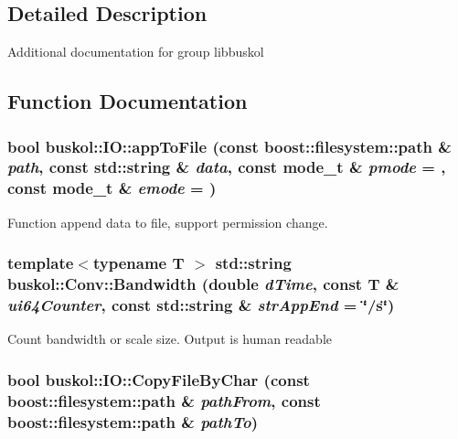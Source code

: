 \subsection{Detailed Description}
Additional documentation for group libbuskol 

\subsection{Function Documentation}
\hypertarget{group__libbuskol_gaada29d4b7a4c47579e1b25ea63c47e15}{
\subsubsection[{appToFile}]{\setlength{\rightskip}{0pt plus 5cm}bool buskol::IO::appToFile (const boost::filesystem::path \& {\em path}, \/  const std::string \& {\em data}, \/  const mode\_\-t \& {\em pmode} = {}, \/  const mode\_\-t \& {\em emode} = {})}}
\label{group__libbuskol_gaada29d4b7a4c47579e1b25ea63c47e15}
Function append data to file, support permission change. \hypertarget{group__libbuskol_gadfc1b8134cb22f8251e3e104a9d82f18}{
\subsubsection[{Bandwidth}]{\setlength{\rightskip}{0pt plus 5cm}template$<$typename T $>$ std::string buskol::Conv::Bandwidth (double {\em dTime}, \/  const T \& {\em ui64Counter}, \/  const std::string \& {\em strAppEnd} = {\ttfamily \char`\"{}/s\char`\"{}})}}
\label{group__libbuskol_gadfc1b8134cb22f8251e3e104a9d82f18}
Count bandwidth or scale size. Output is human readable \hypertarget{group__libbuskol_gafbb450f6ce225235ad7ccab77883aa18}{
\subsubsection[{CopyFileByChar}]{\setlength{\rightskip}{0pt plus 5cm}bool buskol::IO::CopyFileByChar (const boost::filesystem::path \& {\em pathFrom}, \/  const boost::filesystem::path \& {\em pathTo})}}

